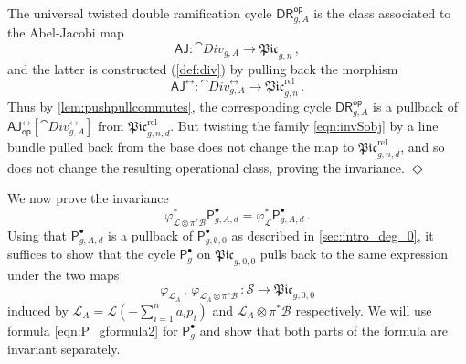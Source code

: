 \documentclass[a4paper,12pt]{article} %
\newcommand{\ca}[1]{{\mathcal{#1}}}
\def\P{\mathsf{P}}
\def\qed{{\hfill $\Diamond$}}
\theoremstyle{definition}
\theoremstyle{plain}%
\renewcommand{\phi}{\varphi}
\newcommand{\aj}{{\scriptstyle \mathsf{AJ}}}
\newcommand{\Picabs}{\mathfrak{Pic}}
\newcommand{\Picrel}{\mathfrak{Pic}^{\mathrm{rel}}}
\newcommand{\jocomment}[1]{}
\newcommand{\DRop}{\mathsf{DR}^{\mathsf{op}}}
\begin{document}
The universal twisted double ramification cycle $\DRop_{g,A}$ is the class associated to the Abel-Jacobi map $$\aj\colon \cat{Div}_{g,A} \to \Picabs_{g,n}\, ,$$
and the latter is constructed (\cref{def:div}) by pulling back the morphism $$\aj^{\rel}\colon \cat{Div}^{\rel}_{g,A} \to \Picrel_{g,n}\, .$$
Thus by \cref{lem:pushpullcommutes}, the corresponding cycle $\DRop_{g,A}$ is a pullback of $\aj^{\rel}_{\mathsf{op}}[\cat{Div}^{\rel}_{g,A}]$ from $\Picrel_{g,n,d}$.
But twisting the family \eqref{eqn:invSobj} by a line bundle pulled back from the base does not change the map to $\Picrel_{g,n,d}$, and so does not change the resulting operational class, proving the invariance.  \qed


We now prove the invariance
$$\phi_{\ca L\otimes \pi^*\ca B}^*\P_{g,A,d}^\bullet=
\phi_\ca L^*\P_{g,A,d}^\bullet  \,  . $$
Using that $\P_{g,A,d}^\bullet$ is a pullback of $\P_{g,\emptyset,0}^\bullet$ as described in \cref{sec:intro_deg_0}, it suffices to show that the cycle $\P_g^\bullet$ on $\Picabs_{g,0,0}$ pulls back to the same expression under the two maps 
\[\phi_{\ca L_A}\, , \,
\phi_{\ca L_A \otimes \pi^* \ca B}\,  : \ca S \to \Picabs_{g,0,0}\]
induced by $\mathcal{L}_{A} = \mathcal{L}(-\sum_{i=1}^n a_i p_i)$ and $\ca L_{A} \otimes \pi^* \ca B$ respectively.
 We will  use formula \eqref{eqn:P_gformula2}
 for $\P_g^\bullet$   and show that both parts of the formula are invariant separately.
\end{document}
